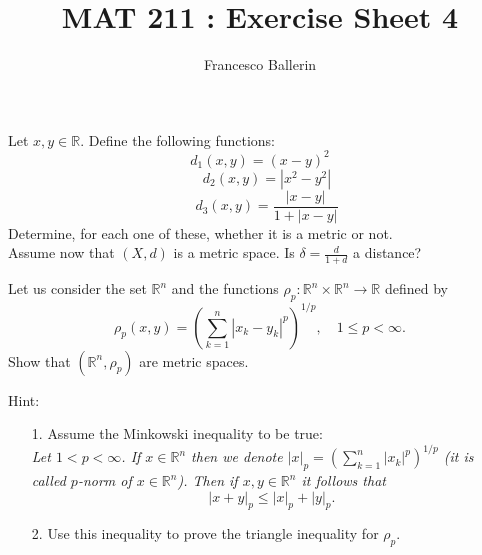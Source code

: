\documentclass[11pt]{article}%
\title{MAT 211 : Exercise Sheet 4}
\author{Francesco Ballerin}
\date{\color{gray}{\small{francesco.ballerin@uib.no}}}
\begin{document}
\begin{minipage}[t]{\dimexpr \textwidth-6cm-\columnsep}
     \maketitle
\end{minipage}
\hfill\noindent{}

\vspace{50pt}

\begin{Exercise}[title=*$\dagger$]
	Let $x,y\in \mathbb R$. Define the following functions:
	$$d_1(x,y)=(x-y)^2$$
	$$\quad d_2(x,y)=|x^2-y^2|$$
	$$\quad d_3(x,y)=\frac{|x-y|}{1+|x-y|}$$
	Determine, for each one of these, whether it is a metric or not.\\
	\smallskip
	Assume now that $(X,d)$ is a metric space. Is $\delta=\frac{d}{1+d}$ a distance?
\end{Exercise}

\begin{Exercise}[title=** - $\ell_p$ spaces]
	Let us consider the set $\mathbb R^n$ and the functions $\rho_p\colon \mathbb R^n\times \mathbb R^n\to \mathbb R$ defined by $$\rho_p(x,y)=(\sum_{k=1}^{n}|x_k-y_k|^p)^{1/p},\quad 1\leq p<\infty.$$ Show that $(\mathbb R^n, \rho_p)$ are metric spaces.
	
	Hint:
	\begin{itemize}
		\item[1.]{Assume the Minkowski inequality to be true:\\{\it Let $1<p<\infty$. If $x\in\mathbb R^n$ then we denote $|x|_p=(\sum_{k=1}^{n}|x_k|^p)^{1/p}$ (it is called $p$-norm of $x\in \mathbb R^n$).  Then if $x,y\in\mathbb R^n$ it follows that $$|x+y|_p\leq|x|_p+|y|_p.$$}}
		\item[2.]{Use this inequality to prove the triangle inequality for $\rho_p$.}
	\end{itemize}
\end{Exercise}
\end{document}
